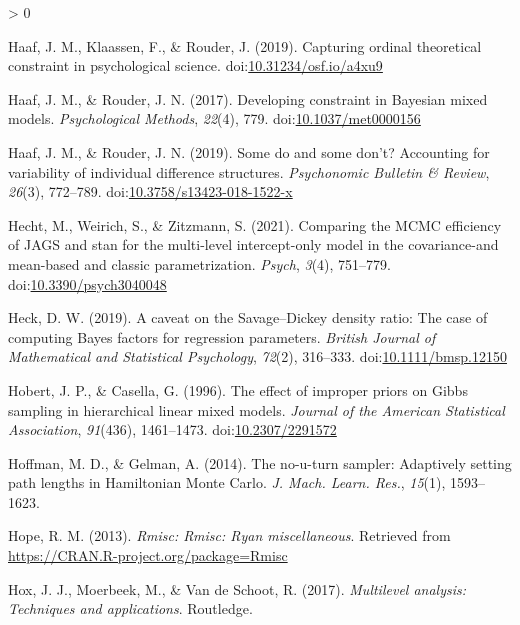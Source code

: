\documentclass[
  english,
  doc,floatsintext]{apa6}
\newlength{\cslhangindent}
\newenvironment{CSLReferences}[2] %
 {%
  \setlength{\parindent}{0pt}
  \ifodd #1 \everypar{\setlength{\hangindent}{\cslhangindent}}\ignorespaces\fi
  \ifnum #2 > 0
  \setlength{\parskip}{#2\baselineskip}
  \fi
 }%
 {}
\begin{document}
\begin{CSLReferences}{1}{0}
\leavevmode\hypertarget{ref-haaf2019capturing}{}%
Haaf, J. M., Klaassen, F., \& Rouder, J. (2019). Capturing ordinal theoretical constraint in psychological science. doi:\href{https://doi.org/10.31234/osf.io/a4xu9}{10.31234/osf.io/a4xu9}

\leavevmode\hypertarget{ref-haaf2017developing}{}%
Haaf, J. M., \& Rouder, J. N. (2017). Developing constraint in {Bayesian} mixed models. \emph{Psychological Methods}, \emph{22}(4), 779. doi:\href{https://doi.org/10.1037/met0000156}{10.1037/met0000156}

\leavevmode\hypertarget{ref-haaf2019some}{}%
Haaf, J. M., \& Rouder, J. N. (2019). Some do and some don't? Accounting for variability of individual difference structures. \emph{Psychonomic Bulletin \& Review}, \emph{26}(3), 772--789. doi:\href{https://doi.org/10.3758/s13423-018-1522-x}{10.3758/s13423-018-1522-x}

\leavevmode\hypertarget{ref-hecht2021comparing}{}%
Hecht, M., Weirich, S., \& Zitzmann, S. (2021). Comparing the MCMC efficiency of JAGS and stan for the multi-level intercept-only model in the covariance-and mean-based and classic parametrization. \emph{Psych}, \emph{3}(4), 751--779. doi:\href{https://doi.org/10.3390/psych3040048}{10.3390/psych3040048}

\leavevmode\hypertarget{ref-heck2019caveat}{}%
Heck, D. W. (2019). A caveat on the {Savage--Dickey} density ratio: The case of computing {Bayes} factors for regression parameters. \emph{British Journal of Mathematical and Statistical Psychology}, \emph{72}(2), 316--333. doi:\href{https://doi.org/10.1111/bmsp.12150}{10.1111/bmsp.12150}

\leavevmode\hypertarget{ref-hobert1996effect}{}%
Hobert, J. P., \& Casella, G. (1996). The effect of improper priors on {Gibbs} sampling in hierarchical linear mixed models. \emph{Journal of the American Statistical Association}, \emph{91}(436), 1461--1473. doi:\href{https://doi.org/10.2307/2291572}{10.2307/2291572}

\leavevmode\hypertarget{ref-hoffman2014no}{}%
Hoffman, M. D., \& Gelman, A. (2014). The no-u-turn sampler: Adaptively setting path lengths in {Hamiltonian Monte Carlo}. \emph{J. Mach. Learn. Res.}, \emph{15}(1), 1593--1623.

\leavevmode\hypertarget{ref-R-Rmisc}{}%
Hope, R. M. (2013). \emph{Rmisc: Rmisc: Ryan miscellaneous}. Retrieved from \url{https://CRAN.R-project.org/package=Rmisc}

\leavevmode\hypertarget{ref-hox2017multilevel}{}%
Hox, J. J., Moerbeek, M., \& Van de Schoot, R. (2017). \emph{Multilevel analysis: Techniques and applications}. Routledge.


\end{CSLReferences}
\end{document}
